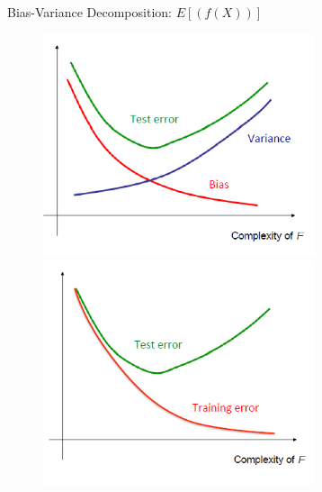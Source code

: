 \documentclass[letterpaper,10pt]{article}
\begin{document}
Bias-Variance Decomposition:
$E[(f(X))]$

\begin{figure}[!h]
	\centering
	\includegraphics[width=8cm]{./img/testerror.png}
	\includegraphics[width=8cm]{./img/trainerror.png}
\end{figure}
\end{document}
